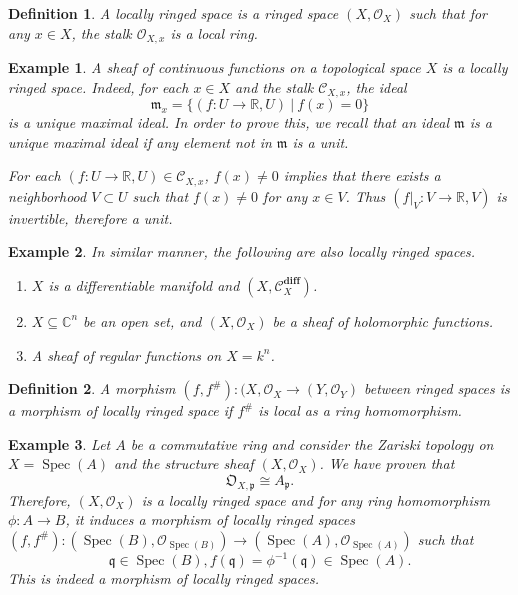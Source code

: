 \documentclass{article}
\newtheorem{definition}{Definition}[section]
\newtheorem{example}{Example}[section]
\numberwithin{equation}{section}
\DeclareMathOperator{\Spec}{Spec}
\begin{document}
\begin{definition}
A locally ringed space is a ringed space $(X,\mathcal{O}_X)$ such that for any $x\in X$, the stalk $\mathcal{O}_{X,x}$ is a local ring.
\end{definition}

\begin{example}
A sheaf of continuous functions on a topological space $X$ is a locally ringed space. Indeed, for each $x\in X$ and the stalk $\mathcal{C}_{X,x}$, the ideal 
\begin{equation*}
\mathfrak{m}_x = \{(f:U\to\mathbb{R},U)\:|\: f(x)=0\}
\end{equation*}
is a unique maximal ideal. In order to prove this, we recall that an ideal $\mathfrak{m}$ is a unique maximal ideal if any element not in $\mathfrak{m}$ is a unit.\\
\par For each $(f:U\to\mathbb{R},U)\in\mathcal{C}_{X,x}$, $f(x)\not=0$ implies that there exists a neighborhood $V\subset U$ such that $f(x)\not=0$ for any $x\in V$. Thus $(f|_V:V\to\mathbb{R},V)$ is invertible, therefore a unit.
\end{example}

\begin{example}
In similar manner, the following are also locally ringed spaces.
\begin{enumerate}
\item $X$ is a differentiable manifold and $(X,\mathcal{C}^{\mathbf{diff}}_X)$.
\item $X\subseteq \mathbb{C}^n$ be an open set, and $(X,\mathcal{O}_X)$ be a sheaf of holomorphic functions.
\item A sheaf of regular functions on $X=k^n$. 
\end{enumerate}
\end{example}

\begin{definition}
A morphism $(f,f^{\#}):(X,\mathcal{O}_X\to(Y,\mathcal{O}_Y)$ between ringed spaces is a morphism of locally ringed space if $f^{\#}$ is local as a ring homomorphism. 
\end{definition}

\begin{example}
Let $A$ be a commutative ring and consider the Zariski topology on $X=\Spec(A)$ and the structure sheaf $(X,\mathcal{O}_X)$. We have proven that 
\begin{equation*}
\mathfrak{O}_{X,\mathfrak{p}}\cong A_{\mathfrak{p}}.
\end{equation*}
Therefore, $(X,\mathcal{O}_X)$ is a locally ringed space and for any ring homomorphism $\phi:A\to B$, it induces a morphism of locally ringed spaces $(f,f^{\#}):(\Spec(B),\mathcal{O}_{\Spec(B)})\to(\Spec(A),\mathcal{O}_{\Spec(A)})$ such that
\begin{equation*}
\mathfrak{q}\in\Spec(B), f(\mathfrak{q}) = \phi^{-1}(\mathfrak{q})\in\Spec(A).
\end{equation*}
This is indeed a morphism of locally ringed spaces. 
\end{example}
\end{document}
